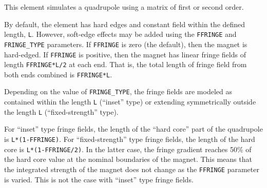 This element simulates a quadrupole using a matrix of first or second order.

By default, the element has hard edges and constant field within the defined
length, {\tt L}.  However, soft-edge effects may be added using the {\tt FFRINGE} and
{\tt FRINGE\_TYPE} parameters.  If {\tt FFRINGE} is zero (the default), then
the magnet is hard-edged.  If {\tt FFRINGE} is positive, then the magnet 
has linear fringe fields of length {\tt FFRINGE*L/2} at each end.  That is,
the total length of fringe field from both ends combined is {\tt FFRINGE*L}.

Depending on the value of {\tt FRINGE\_TYPE}, the fringe fields are
modeled as contained within the length {\tt L} (``inset'' type) or
extending symmetrically outside the length {\tt L} (``fixed-strength''
type).

For ``inset'' type fringe fields, the length of the ``hard core'' part of
the quadrupole is {\tt L*(1-FFRINGE)}.  For ``fixed-strength'' type fringe fields,
the length of the hard core is {\tt L*(1-FFRINGE/2)}.  In the latter case,
the fringe gradient reaches 50\% of the hard core value at the nominal boundaries
of the magnet. This means that the integrated strength of the magnet does not
change as the {\tt FFRINGE} parameter is varied. This is not the case with
``inset'' type fringe fields.


